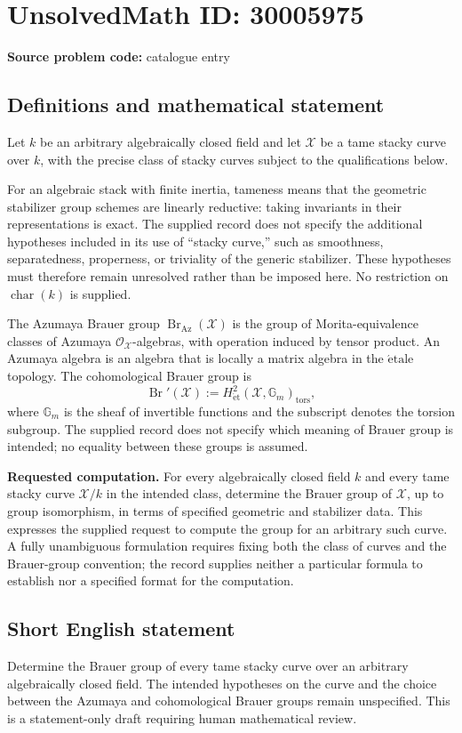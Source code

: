 \documentclass[11pt]{article}
\begin{document}
\section*{UnsolvedMath ID: 30005975}
\textbf{Source problem code:} catalogue entry
\subsection{Definitions and mathematical statement}
Let \(k\) be an arbitrary algebraically closed field and let \(\mathcal X\) be a tame stacky curve over \(k\), with the precise class of stacky curves subject to the qualifications below.

For an algebraic stack with finite inertia, tameness means that the geometric stabilizer group schemes are linearly reductive: taking invariants in their representations is exact. The supplied record does not specify the additional hypotheses included in its use of ``stacky curve,'' such as smoothness, separatedness, properness, or triviality of the generic stabilizer. These hypotheses must therefore remain unresolved rather than be imposed here. No restriction on \(\operatorname{char}(k)\) is supplied.

The Azumaya Brauer group \(\operatorname{Br}_{\mathrm{Az}}(\mathcal X)\) is the group of Morita-equivalence classes of Azumaya \(\mathcal O_{\mathcal X}\)-algebras, with operation induced by tensor product. An Azumaya algebra is an algebra that is locally a matrix algebra in the \(\mathrm{\acute etale}\) topology. The cohomological Brauer group is
\[
\operatorname{Br}'(\mathcal X)
 := H^2_{\mathrm{\acute et}}(\mathcal X,\mathbb G_m)_{\mathrm{tors}},
\]
where \(\mathbb G_m\) is the sheaf of invertible functions and the subscript denotes the torsion subgroup. The supplied record does not specify which meaning of Brauer group is intended; no equality between these groups is assumed.

\textbf{Requested computation.} For every algebraically closed field \(k\) and every tame stacky curve \(\mathcal X/k\) in the intended class, determine the Brauer group of \(\mathcal X\), up to group isomorphism, in terms of specified geometric and stabilizer data. This expresses the supplied request to compute the group for an arbitrary such curve. A fully unambiguous formulation requires fixing both the class of curves and the Brauer-group convention; the record supplies neither a particular formula to establish nor a specified format for the computation.
\subsection{Short English statement}
Determine the Brauer group of every tame stacky curve over an arbitrary algebraically closed field. The intended hypotheses on the curve and the choice between the Azumaya and cohomological Brauer groups remain unspecified. This is a statement-only draft requiring human mathematical review.
\end{document}
